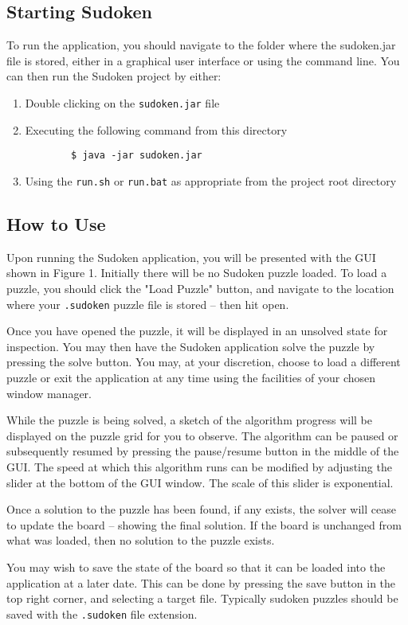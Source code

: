 \subsection{Starting Sudoken}
To run the application, you should navigate to the folder where the sudoken.jar file is stored, either in a graphical user interface or using the command line. You can then run the Sudoken project by either:
\begin{enumerate}
\item Double clicking on the \texttt{sudoken.jar} file

\item Executing the following command from this directory
	\begin{verbatim}
		$ java -jar sudoken.jar
	\end{verbatim}
	
\item Using the \texttt{run.sh} or \texttt{run.bat} as appropriate from the project root directory
\end{enumerate}

\subsection{How to Use}
Upon running the Sudoken application, you will be presented with the GUI shown in Figure 1. Initially there will be no Sudoken puzzle loaded. To load a puzzle, you should click the "Load Puzzle" button, and navigate to the location where your \texttt{.sudoken} puzzle file is stored -- then hit open.

Once you have opened the puzzle, it will be displayed in an unsolved state for inspection. You may then have the Sudoken application solve the puzzle by pressing the solve button. You may, at your discretion, choose to load a different puzzle or exit the application at any time using the facilities of your chosen window manager.

While the puzzle is being solved, a sketch of the algorithm progress will be displayed on the puzzle grid for you to observe. The algorithm can be paused or subsequently resumed by pressing the pause/resume button in the middle of the GUI. The speed at which this algorithm runs can be modified by adjusting the slider at the bottom of the GUI window. The scale of this slider is exponential.

Once a solution to the puzzle has been found, if any exists, the solver will cease to update the board -- showing the final solution. If the board is unchanged from what was loaded, then no solution to the puzzle exists.

You may wish to save the state of the board so that it can be loaded into the application at a later date. This can be done by pressing the save button in the top right corner, and selecting a target file. Typically sudoken puzzles should be saved with the \texttt{.sudoken} file extension.
